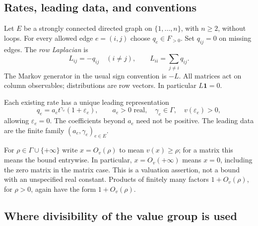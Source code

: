 \documentclass[11pt]{article}
\numberwithin{equation}{section}
\theoremstyle{definition}
\theoremstyle{remark}
\newcommand{\one}{\mathbf 1}
\newcommand{\bigO}[1]{O_v(#1)}
\begin{document}
\subsection{Rates, leading data, and conventions}

Let $E$ be a strongly connected directed graph on $\{1,\ldots,n\}$, with $n\ge2$,
without loops. For every allowed edge $e=(i,j)$ choose $q_e\in F_{>0}$. Set
$q_{ij}=0$ on missing edges. The \emph{row Laplacian} is
\begin{equation}\label{markov:eq:laplacian}
 L_{ij}=-q_{ij}\quad(i\ne j),\qquad
 L_{ii}=\sum_{j\ne i}q_{ij}.
\end{equation}
The Markov generator in the usual sign convention is $-L$. All matrices act on
column observables; distributions are row vectors. In particular $L\one=0$.

Each existing rate has a unique leading representation
\begin{equation}\label{markov:eq:rates}
 q_e=a_e t^{\gamma_e}(1+\varepsilon_e),
 \qquad a_e>0\text{ real},\quad \gamma_e\in\Gamma,
 \quad v(\varepsilon_e)>0,
\end{equation}
allowing $\varepsilon_e=0$. The coefficients beyond $a_e$ need not be positive.
The leading data are the finite family $(a_e,\gamma_e)_{e\in E}$.

For $\rho\in\Gamma\cup\{+\infty\}$ write $x=\bigO{\rho}$ to mean
$v(x)\ge\rho$; for a matrix this means the bound entrywise. In particular,
$x=\bigO{+\infty}$ means $x=0$, including the zero matrix in the matrix case.
This is a valuation assertion, not a bound with an unspecified real constant.
Products of finitely many factors
$1+\bigO{\rho}$, for $\rho>0$, again have the form $1+\bigO{\rho}$.

\subsection{Where divisibility of the value group is used}\label{markov:sec:divisible}
\end{document}
